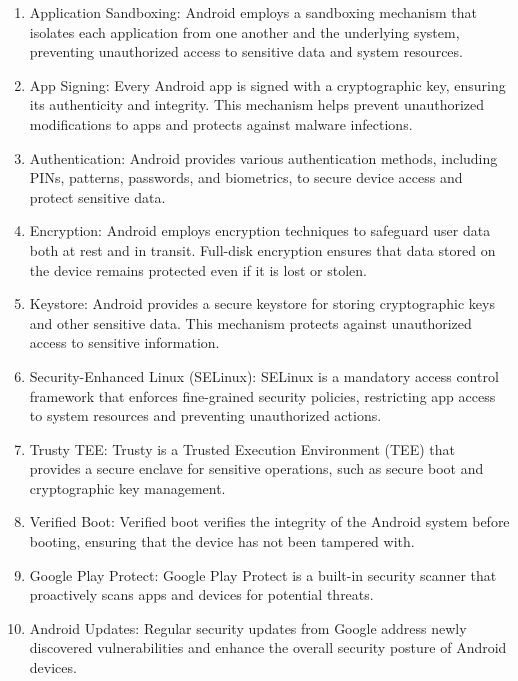 \documentclass[11pt]{article}
\begin{document}
\begin{enumerate}
      \item Application Sandboxing: Android employs a sandboxing mechanism that isolates
            each application from one another and the underlying system, preventing
            unauthorized access to sensitive data and system resources.

      \item App Signing: Every Android app is signed with a cryptographic key, ensuring its
            authenticity and integrity. This mechanism helps prevent unauthorized
            modifications to apps and protects against malware infections.

      \item Authentication: Android provides various authentication methods, including
            PINs, patterns, passwords, and biometrics, to secure device access and protect
            sensitive data.

      \item Encryption: Android employs encryption techniques to safeguard user data both
            at rest and in transit. Full-disk encryption ensures that data stored on the
            device remains protected even if it is lost or stolen.

      \item Keystore: Android provides a secure keystore for storing cryptographic keys and
            other sensitive data. This mechanism protects against unauthorized access to
            sensitive information.

      \item Security-Enhanced Linux (SELinux): SELinux is a mandatory access control
            framework that enforces fine-grained security policies, restricting app access
            to system resources and preventing unauthorized actions.

      \item Trusty TEE: Trusty is a Trusted Execution Environment (TEE) that provides a
            secure enclave for sensitive operations, such as secure boot and cryptographic
            key management.

      \item Verified Boot: Verified boot verifies the integrity of the Android system
            before booting, ensuring that the device has not been tampered with.

      \item Google Play Protect: Google Play Protect is a built-in security scanner that
            proactively scans apps and devices for potential threats.

      \item Android Updates: Regular security updates from Google address newly discovered
            vulnerabilities and enhance the overall security posture of Android devices.
\end{enumerate}
\end{document}
